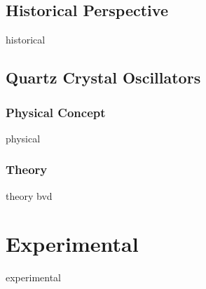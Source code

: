 \documentclass[a4paper,titlepage,onecolumn]{report}
\begin{document}
	\section{Historical Perspective}
	{historical}
	\section{Quartz Crystal Oscillators}
	\subsection{Physical Concept}
	{physical}
	\subsection{Theory}
	{theory}
	{bvd}
\chapter{Experimental}
{experimental}


\appendix



\end{document}
